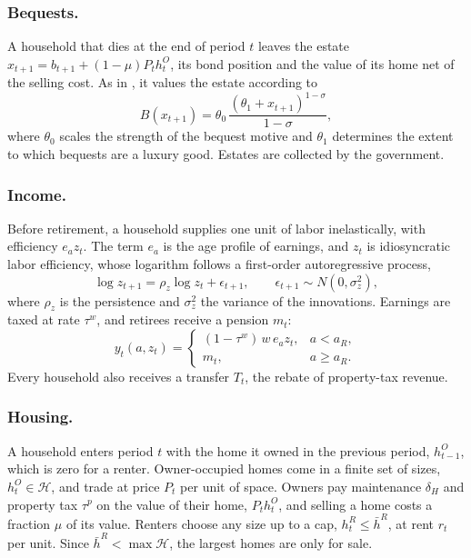 \subsubsection*{Bequests.}
A household that dies at the end of period $t$ leaves the estate
$x_{t+1}=b_{t+1}+(1-\mu)P_th^O_t$, its bond position and the value of its
home net of the selling cost. As in \citet{deNardiWealthInequality2004}, it
values the estate according to
\begin{equation*}
 B(x_{t+1})=\theta_0\,\frac{(\theta_1+x_{t+1})^{1-\sigma}}{1-\sigma},
\end{equation*}
where $\theta_0$ scales the strength of the bequest motive and $\theta_1$
determines the extent to which bequests are a luxury good. Estates are
collected by the government.

\subsubsection*{Income.}
Before retirement, a household supplies one unit of labor inelastically, with
efficiency $e_az_t$. The term $e_a$ is the age profile of earnings, and $z_t$
is idiosyncratic labor efficiency, whose logarithm follows a first-order
autoregressive process,
\begin{equation*}
 \log z_{t+1}=\rho_z\log z_t+\epsilon_{t+1},\qquad
 \epsilon_{t+1}\sim N(0,\sigma_z^2),
\end{equation*}
where $\rho_z$ is the persistence and $\sigma_z^2$ the variance of the
innovations. Earnings are taxed at rate
$\tau^w$, and retirees receive a pension $m_t$:
\begin{equation*}
 y_t(a,z_t)=\begin{cases}(1-\tau^w)\,w\,e_az_t, & a<a_R,\\ m_t, & a\ge a_R.\end{cases}
\end{equation*}
Every household also receives a transfer $T_t$, the rebate of property-tax
revenue.

\subsubsection*{Housing.}
A household enters period $t$ with the home it owned in the previous period,
$h^O_{t-1}$, which is zero for a renter. Owner-occupied homes come in a finite
set of sizes, $h^O_t\in\mathcal H$, and trade at price $P_t$ per unit of
space. Owners pay maintenance $\delta_H$ and property tax $\tau^p$ on the
value of their home, $P_th^O_t$, and selling a home costs a fraction $\mu$ of
its value. Renters choose any size up to a cap, $h^R_t\le\bar h^R$, at rent
$r_t$ per unit. Since $\bar h^R<\max\mathcal H$, the largest homes are only
for sale.

